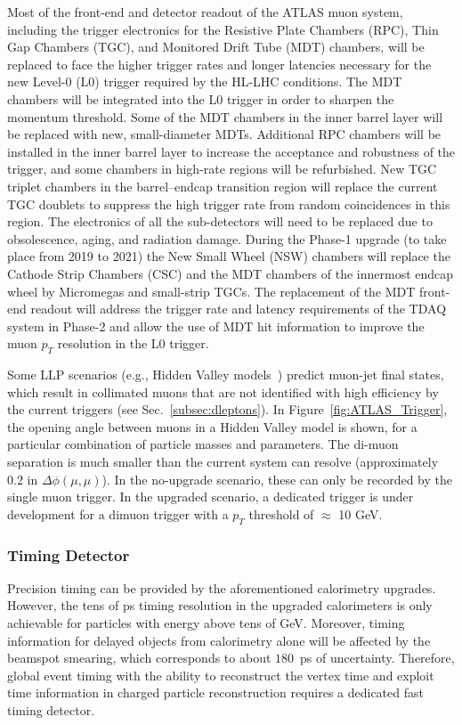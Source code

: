 Most of the front-end and detector readout of the ATLAS muon system, including the trigger electronics for the Resistive Plate Chambers (RPC), Thin Gap Chambers (TGC), and Monitored Drift Tube (MDT) chambers, will be replaced to face the higher trigger rates and longer latencies necessary for the new Level-0 (L0) trigger required by the HL-LHC conditions. The MDT chambers will be integrated into the L0 trigger in order to sharpen the momentum threshold. Some of the MDT chambers in the inner barrel layer will be replaced with new, small-diameter MDTs. Additional RPC chambers will be installed in the inner barrel layer to increase the acceptance and robustness of the trigger, and some chambers in high-rate regions will be refurbished. New TGC triplet chambers in the barrel--endcap transition region will replace the current TGC doublets to suppress the high trigger rate from random coincidences in this region. The electronics of all the sub-detectors will need to be replaced due to obsolescence, aging, and radiation damage. During the Phase-1 upgrade (to take place from 2019 to 2021) the New Small Wheel (NSW) chambers will replace the Cathode Strip Chambers (CSC) and the MDT chambers of the innermost endcap wheel by Micromegas and small-strip TGCs. The replacement of the MDT front-end readout will address the trigger rate and latency requirements of the TDAQ system in Phase-2 and allow the use of MDT hit information to improve the muon $p_T$ resolution in the L0 trigger.

Some LLP scenarios (e.g., Hidden Valley models~\cite{Strassler:2006im}) predict muon-jet final states, which result in collimated muons that are not identified with high efficiency by the current triggers (see Sec.~\ref{subsec:dleptons}). In Figure~\ref{fig:ATLAS_Trigger}, the opening angle between muons in a Hidden Valley model is shown, for a particular combination of particle masses and parameters. The di-muon separation is much smaller than the current system can resolve (approximately 0.2 in $\Delta\phi(\mu,\mu)$). In the no-upgrade scenario, these can only be recorded by the single muon trigger. In the upgraded scenario, a dedicated trigger is under development for a dimuon trigger with a $p_T$ threshold of $\approx$ 10 GeV.

\subsubsection{Timing Detector} \label{sec:upgradetiming}

Precision timing can be provided by the aforementioned calorimetry upgrades. However, the tens of ps timing resolution in the upgraded calorimeters is only achievable for particles with energy above tens of GeV. Moreover, timing information for delayed objects from calorimetry alone will be affected by the beamspot smearing, which corresponds to about $180$~ps of uncertainty. Therefore, global event timing with the ability to reconstruct the vertex time and exploit time information in charged particle reconstruction requires a dedicated fast timing detector.

